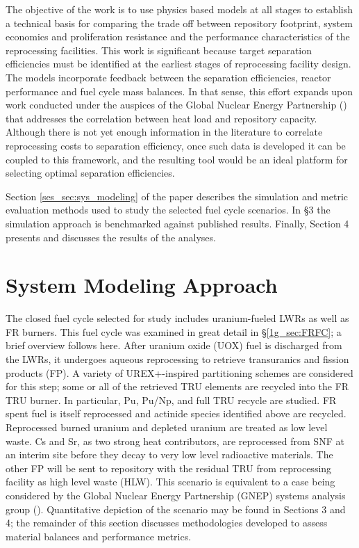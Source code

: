 The objective of the work is to use physics based models at all stages
to establish a technical basis for comparing the trade off between
repository footprint, system economics and proliferation resistance and
the performance characteristics of the reprocessing facilities.  This
work is significant because target separation efficiencies must be
identified at the earliest stages of reprocessing facility design.  The
models incorporate feedback between the separation efficiencies, reactor
performance and fuel cycle mass balances.  In that sense, this effort
expands upon work conducted under the auspices of the Global Nuclear
Energy Partnership () that addresses the correlation between heat load
and repository capacity.  Although there is not yet enough information
in the literature to correlate reprocessing costs to separation
efficiency, once such data is developed it can be coupled to this
framework, and the resulting tool would be an ideal platform for
selecting optimal separation efficiencies.

Section \ref{ses_sec:sys_modeling} of the paper describes the simulation and metric evaluation
methods used to study the selected fuel cycle scenarios.  In \S 3
the simulation approach is benchmarked against published results. 
Finally, Section 4 presents and discusses the results of the analyses.


\section{System Modeling Approach}
\label{ses_sec:sys_modeling}
The closed fuel cycle selected for study includes uranium-fueled LWRs
as well as FR burners.  This fuel cycle was examined in great detail in 
\S \ref{1g_sec:FRFC}; a brief overview follows here.  After uranium oxide 
(UOX) fuel is discharged from the LWRs, it undergoes aqueous reprocessing 
to retrieve transuranics and fission products (FP).  A variety of UREX+-inspired
partitioning schemes are considered for this step; some or all of the
retrieved TRU elements are recycled into the FR TRU burner.  In
particular, Pu, Pu/Np, and full TRU recycle are studied.  FR spent fuel
is itself reprocessed and actinide species identified above are
recycled. Reprocessed burned uranium and depleted uranium are treated as
low level waste. Cs and Sr, as two strong heat contributors, are
reprocessed from SNF at an interim site before they decay to very low
level radioactive materials. The other FP will be sent to repository
with the residual TRU from reprocessing facility as high level waste
(HLW).  This scenario is equivalent to a case being considered by the
Global Nuclear Energy Partnership (GNEP) systems analysis group (). 
Quantitative depiction of the scenario may be found in Sections 3 and 4;
the remainder of this section discusses methodologies developed to
assess material balances and performance metrics.


